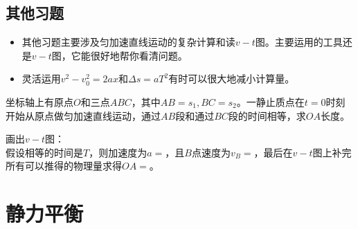 \documentclass[a4paper,9pt]{ctexart}
\begin{document}
\subsection{其他习题}
\begin{itemize}
\item
其他习题主要涉及匀加速直线运动的复杂计算和读$v-t$图。主要运用的工具还是$v-t$图，它能很好地帮你看清问题。
\item
灵活运用$v^2 - v^2_0 = 2ax$和$\Delta s = aT^2$有时可以很大地减小计算量。
\end{itemize}
\begin{eg}
坐标轴上有原点$O$和三点$ABC$，其中$AB = s_1, BC = s_2$。一静止质点在$t=0$时刻开始从原点做匀加速直线运动，通过$AB$段和通过$BC$段的时间相等，求$OA$长度。
\end{eg}
\begin{ans}
画出$v-t$图：
\vspace{4cm}
\\
假设相等的时间是$T$，则加速度为$a = $\hspace{1cm}，且$B$点速度为$v_B = $\hspace{1cm}，最后在$v-t$图上补完所有可以推得的物理量求得$OA=$\hspace{3cm}。
\end{ans}





\newpage

\section{静力平衡}
\end{document}
